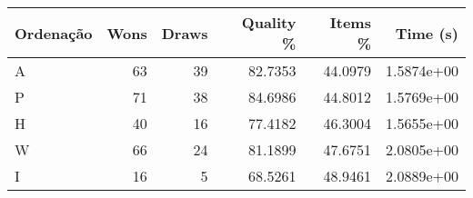 \begin{tabular}{lrrrrr}
    \hline
    Ordenação & Wons & Draws & Quality \% & Items \% & Time (s)   \\
    \hline
    A         & 63   & 39    & 82.7353    & 44.0979  & 1.5874e+00 \\
    P         & 71   & 38    & 84.6986    & 44.8012  & 1.5769e+00 \\
    H         & 40   & 16    & 77.4182    & 46.3004  & 1.5655e+00 \\
    W         & 66   & 24    & 81.1899    & 47.6751  & 2.0805e+00 \\
    I         & 16   & 5     & 68.5261    & 48.9461  & 2.0889e+00 \\
    \hline
\end{tabular}